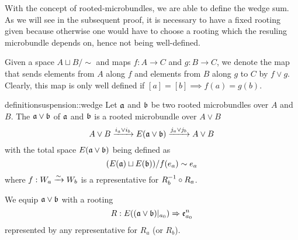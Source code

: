 \begin{myparagraph}
    With the concept of rooted-microbundles,
    we are able to define the wedge sum.
    As we will see in the subsequent proof,
    it is necessary to have a fixed rooting given because otherwise
    one would have to choose a rooting which the resuling microbundle depends on,
    hence not being well-defined.

    Given a space $A \sqcup B / \sim$ and maps $f: A \to C$ and $g: B \to C$, we denote
    the map that sends elements from $A$ along $f$
    and elements from $B$ along $g$ to $C$ by $f \vee g$.
    Clearly, this map is only well defined if $[a] = [b] \implies f(a) = g(b)$.
\end{myparagraph}

\begin{mystatement}{definition}{suspension::wedge}
    Let $\mathfrak{a}$ and $\bb$ be two rooted microbundles over $A$ and $B$.
    The  $\ba \vee \bb$ of $\mathfrak{a}$ and $\bb$ is a rooted microbundle over $A \vee B$
    \[ A \vee B \xto{i_a \vee i_b} E(\ba \vee \bb) \xto{j_a \vee j_b} A \vee B \]
    with the total space $E(\ba \vee \bb)$ being defined as
    \[ (E(\ba) \sqcup E(\bb)) / f(e_a) \sim e_a \]
    where $f: W_a \xrightarrow{\sim} W_b$ is a representative for $R_b^{-1} \circ R_a$.
    
    We equip $\ba \vee \bb$ with a rooting
    \[ \germdef{R}{E((\ba \vee \bb)\restr{a_0})}{\be{a_0}} \]
    represented by any representative for $R_a$ (or $R_b$).
\end{mystatement}

